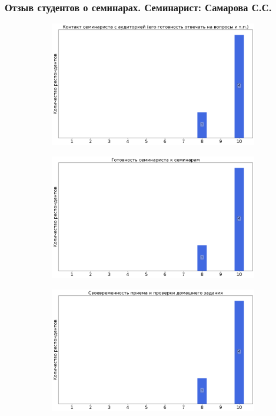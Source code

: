    \subsubsection{Отзыв студентов о семинарах. Семинарист: Самарова С.С.}
		\begin{figure}[H]
			\centering
			\begin{subfigure}[b]{0.45\textwidth}
				\centering
				\includegraphics[width=\textwidth]{images/3 course/ТФКП/seminarists-marks-Самарова С.С.-0.png}
			\end{subfigure}
			\begin{subfigure}[b]{0.45\textwidth}
				\centering
				\includegraphics[width=\textwidth]{images/3 course/ТФКП/seminarists-marks-Самарова С.С.-1.png}
			\end{subfigure}
			\begin{subfigure}[b]{0.45\textwidth}
				\centering
				\includegraphics[width=\textwidth]{images/3 course/ТФКП/seminarists-marks-Самарова С.С.-2.png}

\end{subfigure}
\end{figure}
